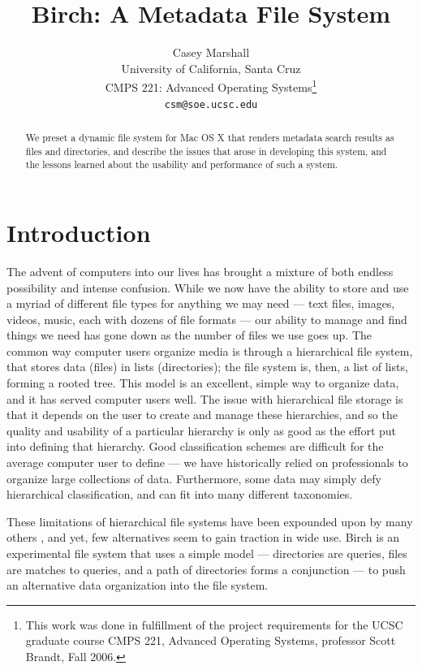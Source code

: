 \documentclass{article}
\begin{document}
\title{Birch: A Metadata File System}
\author{Casey Marshall \\
  University of California, Santa Cruz \\
  CMPS 221: Advanced Operating Systems\footnote{This work was done in
    fulfillment of the project requirements for the UCSC graduate
    course CMPS 221, Advanced Operating Systems, professor Scott
    Brandt, Fall 2006.} \\
  \texttt{csm@soe.ucsc.edu}}
\maketitle

\begin{abstract}
  We preset a dynamic file system for Mac OS X that renders metadata
  search results as files and directories, and describe the issues
  that arose in developing this system, and the lessons learned about
  the usability and performance of such a system.
\end{abstract}

\section{Introduction}
The advent of computers into our lives has brought a mixture of both
endless possibility and intense confusion. While we now have the
ability to store and use a myriad of different file types for anything
we may need --- text files, images, videos, music, each with dozens of
file formats --- our ability to manage and find things we need has
gone down as the number of files we use goes up. The common way
computer users organize media is through a hierarchical file system,
that stores data (files) in lists (directories); the file system is,
then, a list of lists, forming a rooted tree. This model is an
excellent, simple way to organize data, and it has served computer
users well. The issue with hierarchical file storage is that it
depends on the user to create and manage these hierarchies, and so the
quality and usability of a particular hierarchy is only as good as the
effort put into defining that hierarchy. Good classification schemes
are difficult for the average computer user to define --- we have
historically relied on professionals to organize large collections of
data. Furthermore, some data may simply defy hierarchical
classification, and can fit into many different taxonomies.

These limitations of hierarchical file systems have been expounded
upon by many others \cite{OToole:1992, Nielsen:1996, Gorter:2004,
  Nickell:2006}, and yet, few alternatives seem to gain traction in
wide use. Birch is an experimental file system that uses a simple
model --- directories are queries, files are matches to queries, and a
path of directories forms a conjunction --- to push an alternative
data organization into the file system.
\end{document}
